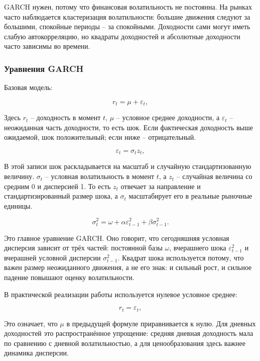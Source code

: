 \documentclass[11pt,a4paper]{article}
\begin{document}
GARCH нужен, потому что финансовая волатильность не постоянна. На рынках часто наблюдается кластеризация волатильности: большие движения следуют за большими, спокойные периоды -- за спокойными. Доходности сами могут иметь слабую автокорреляцию, но квадраты доходностей и абсолютные доходности часто зависимы во времени.

\subsubsection{Уравнения GARCH}

Базовая модель:

\begin{equation}
r_t = \mu + \varepsilon_t,
\end{equation}

Здесь $r_t$ -- доходность в момент $t$, $\mu$ -- условное среднее доходности, а $\varepsilon_t$ -- неожиданная часть доходности, то есть шок. Если фактическая доходность выше ожидаемой, шок положительный; если ниже -- отрицательный.

\begin{equation}
\varepsilon_t = \sigma_t z_t,
\end{equation}

В этой записи шок раскладывается на масштаб и случайную стандартизованную величину. $\sigma_t$ -- условная волатильность в момент $t$, а $z_t$ -- случайная величина со средним 0 и дисперсией 1. То есть $z_t$ отвечает за направление и стандартизированный размер шока, а $\sigma_t$ масштабирует его в реальные рыночные единицы.

\begin{equation}
\sigma_t^2 =
\omega
+ \alpha \varepsilon_{t-1}^2
+ \beta \sigma_{t-1}^2.
\end{equation}

Это главное уравнение GARCH. Оно говорит, что сегодняшняя условная дисперсия зависит от трёх частей: постоянной базы $\omega$, вчерашнего шока $\varepsilon_{t-1}^2$ и вчерашней условной дисперсии $\sigma_{t-1}^2$. Квадрат шока используется потому, что важен размер неожиданного движения, а не его знак: и сильный рост, и сильное падение повышают оценку волатильности.

В практической реализации работы используется нулевое условное среднее:

\begin{equation}
r_t = \varepsilon_t,
\end{equation}

Это означает, что $\mu$ в предыдущей формуле приравнивается к нулю. Для дневных доходностей это распространённое упрощение: средняя дневная доходность мала по сравнению с дневной волатильностью, а для ценообразования здесь важнее динамика дисперсии.
\end{document}
